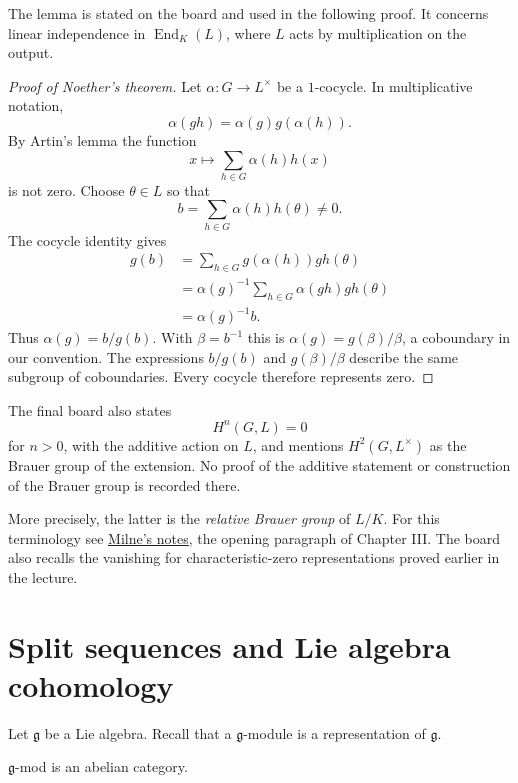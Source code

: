 \noindent
The lemma is stated on the board and
used in the following proof. It concerns
linear independence in
$\operatorname{End}_K(L)$, where $L$
acts by multiplication on the output.

\begin{proof}[Proof of Noether's theorem]
Let $\alpha:G\to L^{\times}$ be a
$1$-cocycle. In multiplicative notation,
$$
\alpha(gh)=\alpha(g)g(\alpha(h)).
$$
By Artin's lemma the function
$$
x\longmapsto\sum_{h\in G}\alpha(h)h(x)
$$
is not zero. Choose $\theta\in L$ so that
$$
b=\sum_{h\in G}\alpha(h)h(\theta)\ne0.
$$
The cocycle identity gives
$$
\begin{aligned}
g(b)&=\sum_{h\in G}g(\alpha(h))gh(\theta)\\
&=\alpha(g)^{-1}
\sum_{h\in G}\alpha(gh)gh(\theta)\\
&=\alpha(g)^{-1}b.
\end{aligned}
$$
Thus $\alpha(g)=b/g(b)$. With
$\beta=b^{-1}$ this is
$\alpha(g)=g(\beta)/\beta$, a coboundary
in our convention. The expressions
$b/g(b)$ and $g(\beta)/\beta$ describe
the same subgroup of coboundaries.
Every cocycle therefore represents zero.
\end{proof}

\begin{remark}
\label{remark-galois-closing-4-sept}
The final board also states
$$
H^n(G,L)=0
$$
for $n>0$, with the additive action on
$L$, and mentions $H^2(G,L^{\times})$
as the Brauer group of the extension.
No proof of the additive statement or
construction of the Brauer group is
recorded there.

More precisely, the latter is the
\emph{relative Brauer group} of $L/K$.
For this terminology see
\href{https://www.jmilne.org/math/%
CourseNotes/CFT.pdf}{Milne's notes},
the opening paragraph of Chapter III.
The board also recalls the vanishing for
characteristic-zero representations proved
earlier in the lecture.
\end{remark}


\section{Split sequences and Lie algebra
cohomology}
\label{section-g-modules}

\noindent
Let $\mathfrak{g}$ be a Lie algebra.
Recall that a $\mathfrak{g}$-module
is a representation of $\mathfrak{g}$.

\begin{proposition}
\label{proposition-g-mod-abelian-category}
$\mathfrak{g}$-mod is an abelian category.
\end{proposition}

